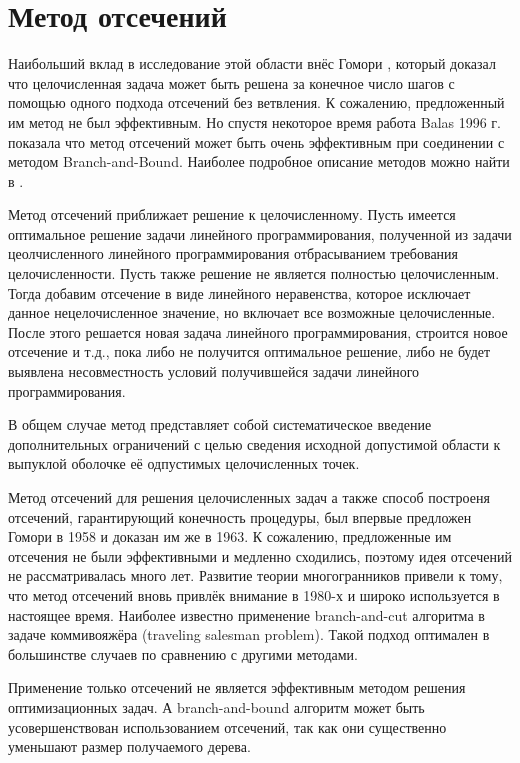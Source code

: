 \documentclass[a4paper,14pt,russian]{extreport}
\begin{document}
\section{Метод отсечений}
\par
Наибольший вклад в исследование этой области внёс Гомори \cite{gomory} \cite{gomory_1}, который доказал что целочисленная задача может быть решена за конечное число шагов с помощью одного подхода отсечений без ветвления. К сожалению, предложенный им метод не был эффективным. Но спустя некоторое время работа Balas \cite{balas_ceria_corn_natraj} 1996 г. показала что метод отсечений может быть очень эффективным при соединении с методом Branch-and-Bound. Наиболее подробное описание методов можно найти в \cite{klar} \cite{wolter} \cite{marchand} \cite{fuegenschuh}.
\par
\par 
Метод отсечений приближает решение к целочисленному. Пусть имеется оптимальное решение задачи линейного программирования, полученной из задачи цеолчисленного линейного программирования отбрасыванием требования целочисленности. Пусть также решение не является полностью целочисленным. Тогда добавим отсечение в виде линейного неравенства, которое исключает данное нецелочисленное значение, но включает все возможные целочисленные. После этого решается новая задача линейного программирования, строится новое отсечение и т.д., пока либо не получится оптимальное решение, либо не будет выявлена несовместность условий получившейся задачи линейного программирования. 
\par 
В общем случае метод представляет собой систематическое введение дополнительных ограничений с целью сведения исходной допустимой области к выпуклой оболочке её одпустимых целочисленных точек.
\par
Метод отсечений для решения целочисленных задач а также способ построеня отсечений, гарантирующий конечность процедуры, был впервые предложен Гомори в 1958 \cite{gomory_1} и доказан им же в 1963\cite{gomory}. К сожалению, предложенные им отсечения не были эффективными и медленно сходились, поэтому идея отсечений не рассматривалась много лет. Развитие теории многогранников привели к тому, что метод отсечений вновь привлёк внимание в 1980-х и широко используется в настоящее время. Наиболее известно применение branch-and-cut алгоритма в задаче коммивояжёра (traveling salesman problem). Такой подход оптимален в большинстве случаев по сравнению с другими методами. 
\par
Применение только отсечений не является эффективным методом решения оптимизационных задач. А branch-and-bound алгоритм может быть усовершенствован использованием отсечений, так как они существенно уменьшают размер получаемого дерева.
\end{document}
